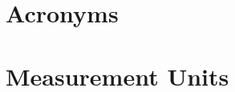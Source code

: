 




\tableofcontents 
\clearpage



\newpage
\thispagestyle{empty}
\chapter*{Acronyms}






\listoftables
\listoffigures
\clearpage



\newpage
\thispagestyle{empty}
\chapter*{Measurement Units}



